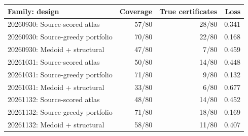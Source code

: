 \begin{tabular}{lrrr}
\toprule
Family: design & Coverage & True certificates & Loss \\
\midrule
20260930: Source-scored atlas & 57/80 & 28/80 & 0.341 \\
20260930: Source-greedy portfolio & 70/80 & 22/80 & 0.168 \\
20260930: Medoid + structural & 47/80 & 7/80 & 0.459 \\
20261031: Source-scored atlas & 50/80 & 14/80 & 0.448 \\
20261031: Source-greedy portfolio & 71/80 & 9/80 & 0.132 \\
20261031: Medoid + structural & 33/80 & 6/80 & 0.677 \\
20261132: Source-scored atlas & 48/80 & 14/80 & 0.452 \\
20261132: Source-greedy portfolio & 71/80 & 18/80 & 0.169 \\
20261132: Medoid + structural & 58/80 & 11/80 & 0.407 \\
\bottomrule
\end{tabular}
